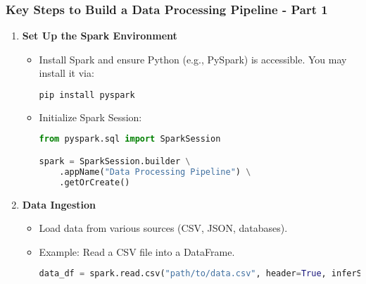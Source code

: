 \documentclass[aspectratio=169]{beamer}
\begin{document}
\begin{frame}[fragile]
  \frametitle{Key Steps to Build a Data Processing Pipeline - Part 1}
  \begin{enumerate}
    \item \textbf{Set Up the Spark Environment}
      \begin{itemize}
        \item Install Spark and ensure Python (e.g., PySpark) is accessible. You may install it via:
        \begin{lstlisting}[language=bash]
pip install pyspark
        \end{lstlisting}
        \item Initialize Spark Session:
        \begin{lstlisting}[language=python]
from pyspark.sql import SparkSession

spark = SparkSession.builder \
    .appName("Data Processing Pipeline") \
    .getOrCreate()
        \end{lstlisting}
      \end{itemize}
  
    \item \textbf{Data Ingestion}
      \begin{itemize}
        \item Load data from various sources (CSV, JSON, databases).
        \item Example: Read a CSV file into a DataFrame.
        \begin{lstlisting}[language=python]
data_df = spark.read.csv("path/to/data.csv", header=True, inferSchema=True)
        \end{lstlisting}
      \end{itemize}
  \end{enumerate}
\end{frame}
\end{document}
